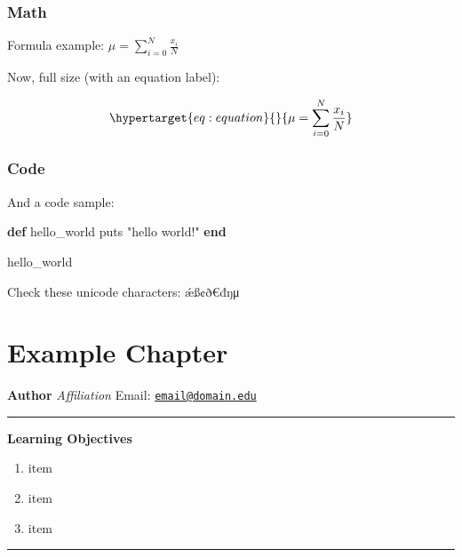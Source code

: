 \documentclass[
  11pt,
,
onecolumn,
openany
]{book}
\providecommand{\tightlist}{%
  \setlength{\itemsep}{0pt}\setlength{\parskip}{0pt}}
\newenvironment{Shaded}{}{}
\newcommand{\ControlFlowTok}[1]{\textcolor[rgb]{0.00,0.44,0.13}{\textbf{#1}}}
\newcommand{\FunctionTok}[1]{\textcolor[rgb]{0.02,0.16,0.49}{#1}}
\newcommand{\NormalTok}[1]{#1}
\newcommand{\StringTok}[1]{\textcolor[rgb]{0.25,0.44,0.63}{#1}}
\begin{document}
\hypertarget{math-1}{%
\subsection{Math}\label{math-1}}

Formula example: \(\mu = \sum_{i=0}^{N} \frac{x_i}{N}\)

Now, full size (with an equation label):

\begin{equation}\protect\hypertarget{eq:equation}{}{\mu = \sum_{i=0}^{N} \frac{x_i}{N}}\label{eq:equation}\end{equation}

\hypertarget{code}{%
\subsection{Code}\label{code}}

And a code sample:

\begin{Shaded}
\begin{Highlighting}[]
\ControlFlowTok{def}\NormalTok{ hello\_world}
  \FunctionTok{puts} \StringTok{"hello world!"}
\ControlFlowTok{end}

\NormalTok{hello\_world}
\end{Highlighting}
\end{Shaded}

Check these unicode characters: ǽß¢ð€đŋμ

\hypertarget{example-chapter}{%
\chapter{Example Chapter}\label{example-chapter}}

\textbf{Author} \emph{Affiliation} Email:
\href{mailto:email@domain.edu}{\nolinkurl{email@domain.edu}}

\begin{center}\rule{0.5\linewidth}{0.5pt}\end{center}

\textbf{Learning Objectives}

\begin{enumerate}
\def\labelenumi{\arabic{enumi}.}
\tightlist
\item
  item
\item
  item
\item
  item
\end{enumerate}

\begin{center}\rule{0.5\linewidth}{0.5pt}\end{center}
\end{document}
